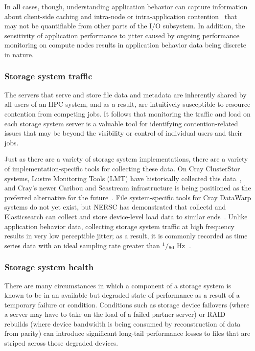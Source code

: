 In all cases, though, understanding application behavior can capture information about client-side caching and intra-node or intra-application contention~\cite{Lofstead2010} that may not be quantifiable from other parts of the I/O subsystem.
In addition, the sensitivity of application performance to jitter caused by ongoing performance monitoring on compute nodes results in application behavior data being discrete in nature.

\subsubsection{Storage system traffic} \label{sec:architecture/components/fs}

The servers that serve and store file data and metadata are inherently shared by all users of an HPC system, and as a result, are intuitively susceptible to resource contention from competing jobs.
It follows that monitoring the traffic and load on each storage system server is a valuable tool for identifying contention-related issues that may be beyond the visibility or control of individual users and their jobs.

Just as there are a variety of storage system implementations, there are a variety of implementation-specific tools for collecting these data.
On Cray ClusterStor systems, Lustre Monitoring Tools (LMT) have historically collected this data~\cite{Keopp2014}, and Cray's newer Caribou and Seastream infrastructure is being positioned as the preferred alternative for the future~\cite{Flaskerud2017}.
File system-specific tools for Cray DataWarp systems do not yet exist, but NERSC has demonstrated that collectd and Elasticsearch can collect and store device-level load data to similar ends~\cite{Whitney2016}.
Unlike application behavior data, collecting storage system traffic at high frequency results in very low perceptible jitter; as a result, it is commonly recorded as time series data with an ideal sampling rate greater than ${{^1 / _{60} \textup{ Hz}}}$~\cite{Madireddy2017}.

\subsubsection{Storage system health}  \label{sec:architecture/components/fshealth}

There are many circumstances in which a component of a storage system is known to be in an available but degraded state of performance as a result of a temporary failure or condition.
Conditions such as storage device failovers (where a server may have to take on the load of a failed partner server) or RAID rebuilds (where device bandwidth is being consumed by reconstruction of data from parity) can introduce significant long-tail performance losses to files that are striped across those degraded devices.

